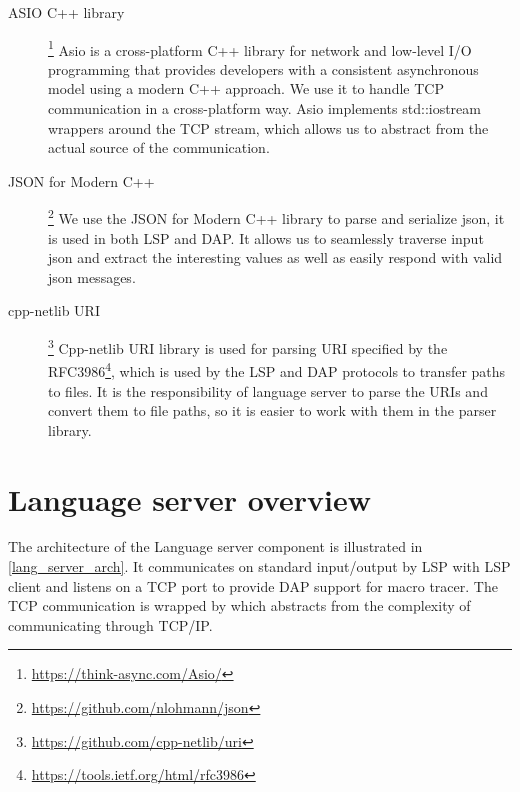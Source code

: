 \begin{description}
	\item [ASIO C++ library]\hspace{-4px}\footnote{\url{https://think-async.com/Asio/}}
Asio is a cross-platform C++ library for network and low-level I/O programming that provides developers with a consistent asynchronous model using a modern C++ approach. We use it to handle TCP communication in a cross-platform way. Asio implements std::iostream wrappers around the TCP stream, which allows us to abstract from the actual source of the communication.

\item [JSON for Modern C++]\hspace{-4px}\footnote{\url{https://github.com/nlohmann/json}} We use the JSON for Modern C++ library to parse and serialize json, it is used in both LSP and DAP. It allows us to seamlessly traverse input json and extract the interesting values as well as easily respond with valid json messages.

\item [cpp-netlib URI]\hspace{-4px}\footnote{\url{https://github.com/cpp-netlib/uri}} Cpp-netlib URI library is used for parsing URI specified by the RFC3986\footnote{\url{https://tools.ietf.org/html/rfc3986}}, which is used by the LSP and DAP protocols to transfer paths to files. It is the responsibility of language server to parse the URIs and convert them to file paths, so it is easier to work with them in the parser library. 
\end{description}

\section{Language server overview}
The architecture of the Language server component is illustrated in \cref{lang_server_arch}. It communicates on standard input/output by LSP with LSP client and listens on a TCP port to provide DAP support for macro tracer. The TCP communication is wrapped by  which abstracts from the complexity of communicating through TCP/IP.



